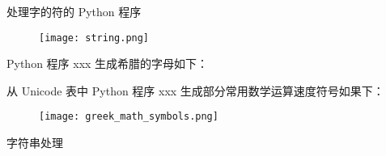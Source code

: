 \documentclass[main.tex]{subfiles}
\begin{document}
处理字的符的 Python 程序

\begin{figure}
	\texttt{[image: string.png]}
\end{figure}

Python 程序 xxx 生成希腊的字母如下：


从 Unicode 表中 Python 程序 xxx 生成部分常用数学运算速度符号如果下：

\newpage
\begin{figure}
	\texttt{[image: greek\_math\_symbols.png]}
\end{figure}


字符串处理

\newpage
\end{document}
